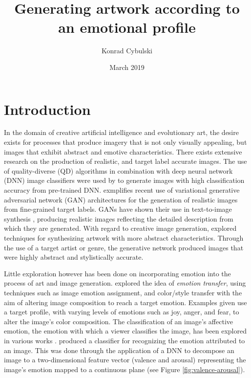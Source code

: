 \documentclass{article}
\title{Generating artwork according to an emotional profile}
\author{Konrad Cybulski}
\date{March 2019}
\begin{document}
	
\maketitle

\section{Introduction}

In the domain of creative artificial intelligence and evolutionary art, the desire exists for processes that produce imagery that is not only visually appealing, but images that exhibit abstract and emotive characteristics.
There exists extensive research on the production of realistic, and target label accurate images.
The use of quality-diverse (QD) algorithms in combination with deep neural network (DNN) image classifiers were used by \citet{nguyen2015innovation} to generate images with high classification accuracy from pre-trained DNN.
\citet{bao2017cvae} exmplifies recent use of variational generative adversarial network (GAN) architectures for the generation of realistic images from fine-grained target labels.
GANs have shown their use in text-to-image synthesis \citep{reed2016generative, zhang2017stackgan}, producing realistic images reflecting the detailed description from which they are generated.
With regard to creative image generation, \citet{tan2017artgan} explored techniques for synthesizing artwork with more abstract characteristics.
Through the use of a target artist or genre, the generative network produced images that were highly abstract and stylistically accurate.

Little exploration however has been done on incorporating emotion into the process of art and image generation.
\citet{ali2017emotional} explored the idea of \textit{emotion transfer}, using techniques such as image emotion assignment, and color/style transfer with the aim of altering image composition to reach a target emotion.
Examples given use a target profile, with varying levels of emotions such as joy, anger, and fear, to alter the image's color composition.
The classification of an image's affective emotion, the emotion with which a viewer classifies the image, has been explored in various works \citep{machajdik2010affective, chen2015learning, kim2018building}.
\citet{kim2018building} produced a classifier for recognizing the emotion attributed to an image.
This was done through the application of a DNN to decompose an image to a two-dimensional feature vector (valence and arousal) representing the image's emotion mapped to a continuous plane (see Figure \ref{fig:valence-arousal}).
\end{document}
